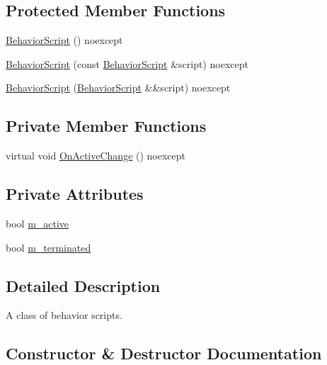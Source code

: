 \subsection*{Protected Member Functions}
\begin{DoxyCompactItemize}
\item 
\hyperlink{classmage_1_1_behavior_script_adbe64d10ebd511f05af9e0930e245913}{Behavior\+Script} () noexcept
\item 
\hyperlink{classmage_1_1_behavior_script_a0f3baaa9549ab272f0711c06d33ad223}{Behavior\+Script} (const \hyperlink{classmage_1_1_behavior_script}{Behavior\+Script} \&script) noexcept
\item 
\hyperlink{classmage_1_1_behavior_script_abae69e797a05fa2cd1c3b7704f1c6767}{Behavior\+Script} (\hyperlink{classmage_1_1_behavior_script}{Behavior\+Script} \&\&script) noexcept
\end{DoxyCompactItemize}
\subsection*{Private Member Functions}
\begin{DoxyCompactItemize}
\item 
virtual void \hyperlink{classmage_1_1_behavior_script_a17703fd980599ccf7265b5ffc6148fe8}{On\+Active\+Change} () noexcept
\end{DoxyCompactItemize}
\subsection*{Private Attributes}
\begin{DoxyCompactItemize}
\item 
bool \hyperlink{classmage_1_1_behavior_script_a18f81792aed31a2d61a8a75784e2ceef}{m\+\_\+active}
\item 
bool \hyperlink{classmage_1_1_behavior_script_abc4a0e6728787347012404a597ab8e07}{m\+\_\+terminated}
\end{DoxyCompactItemize}


\subsection{Detailed Description}
A class of behavior scripts. 

\subsection{Constructor \& Destructor Documentation}
\hypertarget{classmage_1_1_behavior_script_a61e4825ba0fc7746d49faa44ed7bc481}{}\label{classmage_1_1_behavior_script_a61e4825ba0fc7746d49faa44ed7bc481} 
